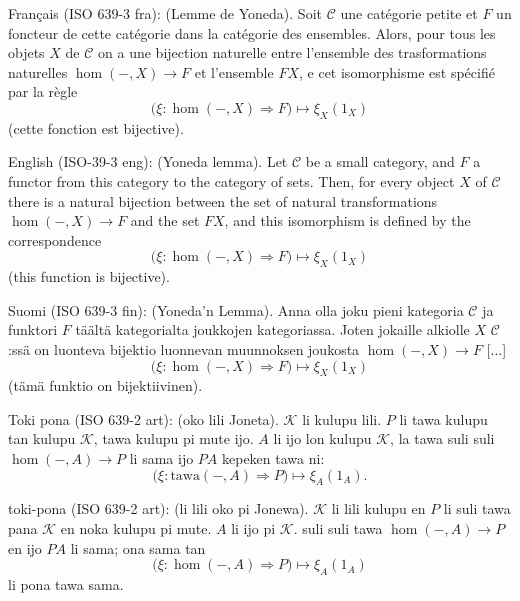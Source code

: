 \documentclass{article}
\newcommand{\tran}[3]{%
	\noindent\textsf{#1:} (#2). #3%
	\medskip\newline
}
\begin{document}
\tran{Français (ISO 639-3 fra)}{Lemme de Yoneda}{
	Soit $\mathcal C$ une catégorie petite et $F$ un foncteur de cette catégorie dans la catégorie des ensembles. Alors, pour tous les objets $X$ de $\mathcal C$ on a une bijection naturelle entre l'ensemble des trasformations naturelles $\hom(-,X)\to F$ et l'ensemble $FX$, e cet isomorphisme est spécifié par la règle
	\[
		\Big(\xi : \hom(-,X)\Rightarrow F\Big) \mapsto \xi_X(1_X)
	\]
	(cette fonction est bijective).
}
\tran{English (ISO-39-3 eng)}{Yoneda lemma}{
Let $\mathcal C$ be a small category, and $F$ a functor from this category to the category of sets. Then, for every object $X$ of $\mathcal C$ there is a natural bijection between the set of natural transformations $\hom(-,X)\to F$ and the set $FX$, and this isomorphism is defined by the correspondence
\[
	\Big(\xi : \hom(-,X)\Rightarrow F\Big) \mapsto \xi_X(1_X)
\]
(this function is bijective).
}
\tran{Suomi (ISO 639-3 fin)}{Yoneda'n Lemma}{
	Anna olla joku pieni kategoria $\mathcal C$ ja funktori $F$ täältä kategorialta joukkojen kategoriassa. Joten jokaille alkiolle $X$ $\mathcal C$:ssä on luonteva bijektio luonnevan muunnoksen joukosta $\hom(-,X)\to F$ [...]
	\[
		\Big(\xi : \hom(-,X)\Rightarrow F\Big) \mapsto \xi_X(1_X)
	\]
	(tämä funktio on bijektiivinen).
}
\tran{Toki pona (ISO 639-2 art)}{oko lili Joneta}{$\mathcal K$ li kulupu lili. $P$ li tawa kulupu tan kulupu  $\mathcal K$, tawa kulupu pi mute ijo. $A$ li ijo lon kulupu $\mathcal K$, la tawa suli suli $\hom(-,A)\to P$ li sama ijo $PA$ kepeken tawa ni:
\[
	\Big(\xi : \mathrm{tawa}(-,A)\Rightarrow P\Big) \mapsto \xi_A(1_A).
\]}
\tran{{\tp toki-pona} (ISO 639-2 art)}{{\tp li lili oko pi Jonewa}}{$\mathcal K$ {\tp li lili kulupu en} $P$ {\tp li suli tawa pana} $\mathcal K$ {\tp en noka kulupu pi mute}. $A$ {\tp li ijo pi} $\mathcal K$. {\tp suli suli tawa} $\hom(-,A)\to P$ {\tp en ijo} $PA$ {\tp li sama; ona sama tan}
\[
	\Big(\xi : \hom(-,A)\Rightarrow P\Big) \mapsto \xi_A(1_A)
\]
li pona tawa sama.}
\end{document}
